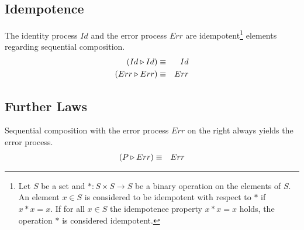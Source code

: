 \subsection{Idempotence}
\vspace*{-0.75em}
The identity process $Id$ and the error process $Err$ are idempotent\footnote{Let $S$ be a set and $\ast \colon S \times S \to S$ be a binary operation on the elements of $S$. An element $x \in S$ is considered to be idempotent with respect to $\ast$ if $x \ast x = x$. If for all $x \in S$ the idempotence property $x \ast x = x$ holds, the operation $\ast$ is considered idempotent.} elements regarding sequential composition.
\vspace*{-1em}
\begin{eqnarray*}
  \left( Id \triangleright Id \right) & \equiv & Id \\
  \left( Err \triangleright Err \right) & \equiv & Err
\end{eqnarray*}

\vspace*{-0.75em}
\subsection{Further Laws}
\vspace*{-0.75em}
Sequential composition with the error process $Err$ on the right always yields the error process.
\vspace*{-1em}
\begin{eqnarray*}
  \left( P \triangleright Err \right) & \equiv & Err
\end{eqnarray*}
\vspace*{-1.5em}